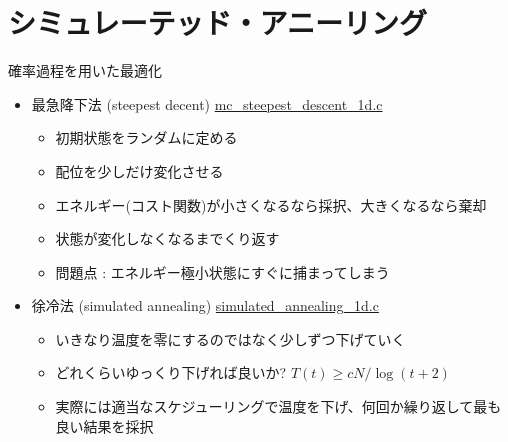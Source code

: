 \section{シミュレーテッド・アニーリング}

\begin{frame}[t,fragile]{確率過程を用いた最適化}
  \begin{itemize}
    \setlength{\itemsep}{1em}
  \item 最急降下法 (steepest decent) {\footnotesize \href{https://github.com/todo-group/computer-experiments/blob/master/exercise/optimization/mc_steepest_descent_1d.c}{mc\_steepest\_descent\_1d.c}}
    \begin{itemize}
    \item 初期状態をランダムに定める
    \item 配位を少しだけ変化させる
    \item エネルギー(コスト関数)が小さくなるなら採択、大きくなるなら棄却
    \item 状態が変化しなくなるまでくり返す %
    \item 問題点 : エネルギー極小状態にすぐに捕まってしまう
    \end{itemize}
  \item 徐冷法 (simulated annealing) {\footnotesize \href{https://github.com/todo-group/computer-experiments/blob/master/exercise/optimization/simulated_annealing_1d.c}{simulated\_annealing\_1d.c}}
    \begin{itemize}
    \item いきなり温度を零にするのではなく少しずつ下げていく
    \item どれくらいゆっくり下げれば良いか? $
      T(t) \ge cN / \log(t+2)
      $
    \item 実際には適当なスケジューリングで温度を下げ、何回か繰り返して最も良い結果を採択
    \end{itemize}
  \end{itemize}
\end{frame}

